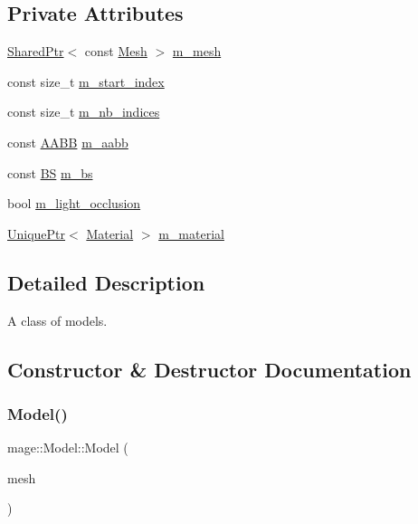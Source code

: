 \subsection*{Private Attributes}
\begin{DoxyCompactItemize}
\item 
\hyperlink{namespacemage_a1e01ae66713838a7a67d30e44c67703e}{Shared\+Ptr}$<$ const \hyperlink{classmage_1_1_mesh}{Mesh} $>$ \hyperlink{classmage_1_1_model_aecd2b4031c5df30fb5f7ed6d62810f73}{m\+\_\+mesh}
\item 
const size\+\_\+t \hyperlink{classmage_1_1_model_a63a3e697c9eb1606249de15cc7b818c3}{m\+\_\+start\+\_\+index}
\item 
const size\+\_\+t \hyperlink{classmage_1_1_model_a1fcf80ed9f3002bd2319ef83f073ae75}{m\+\_\+nb\+\_\+indices}
\item 
const \hyperlink{structmage_1_1_a_a_b_b}{A\+A\+BB} \hyperlink{classmage_1_1_model_ab53a0f253df545fd59723bee107bf523}{m\+\_\+aabb}
\item 
const \hyperlink{structmage_1_1_b_s}{BS} \hyperlink{classmage_1_1_model_a1d3ea0a9f302f623dcaceb2df4315a0b}{m\+\_\+bs}
\item 
bool \hyperlink{classmage_1_1_model_af6e1183a2f2147b7848aa10010bdfcd3}{m\+\_\+light\+\_\+occlusion}
\item 
\hyperlink{namespacemage_a3316d7143a973e37adf1110f2e80ca31}{Unique\+Ptr}$<$ \hyperlink{classmage_1_1_material}{Material} $>$ \hyperlink{classmage_1_1_model_a88d97cd87b7ef37130f7a4007477698a}{m\+\_\+material}
\end{DoxyCompactItemize}


\subsection{Detailed Description}
A class of models. 

\subsection{Constructor \& Destructor Documentation}
\hypertarget{classmage_1_1_model_a6f67b215aa2db0a593ef7a8ee77fb4d3}{}\label{classmage_1_1_model_a6f67b215aa2db0a593ef7a8ee77fb4d3} 
\subsubsection{\texorpdfstring{Model()}{Model()}\hspace{0.1cm}{\footnotesize\ttfamily [1/4]}}
{\footnotesize\ttfamily mage\+::\+Model\+::\+Model (\begin{DoxyParamCaption}\item[{\hyperlink{namespacemage_a1e01ae66713838a7a67d30e44c67703e}{Shared\+Ptr}$<$ const \hyperlink{classmage_1_1_static_mesh}{Static\+Mesh} $>$}]{mesh }\end{DoxyParamCaption})\hspace{0.3cm}{\ttfamily [explicit]}}


